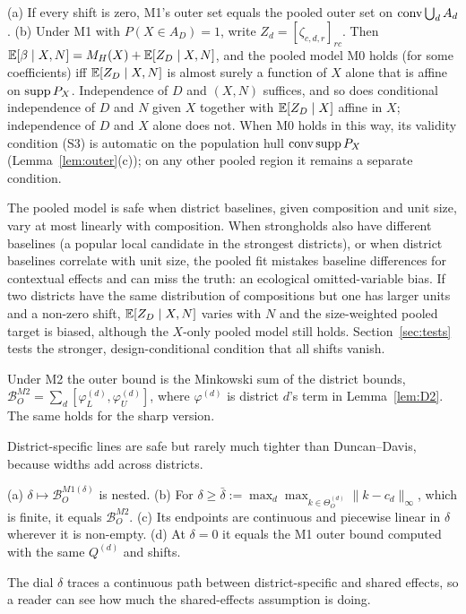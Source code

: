 \begin{proposition}\label{prop:D4}
(a) If every shift is zero, M1's outer set equals the pooled outer set on
$\operatorname{conv}\bigcup_dA_d$. (b) Under M1 with $P(X\in A_D)=1$, write $Z_d=[\zeta_{c,d,r}]_{rc}$.
Then $\mathbb E[\beta\mid X,N]=M_H(X)+\mathbb E[Z_D\mid X,N]$, and the pooled model M0 holds
(for some coefficients) iff $\mathbb E[Z_D\mid X,N]$ is almost surely a function of $X$
alone that is affine on $\operatorname{supp} P_X$. Independence of $D$ and $(X,N)$ suffices, and
so does conditional independence of $D$ and $N$ given $X$ together with
$\mathbb E[Z_D\mid X]$ affine in $X$; independence of $D$ and $X$ alone does not. When M0
holds in this way, its validity condition (S3) is automatic on the population hull
$\operatorname{conv}\operatorname{supp} P_X$ (Lemma~\ref{lem:outer}(c)); on any other pooled region it remains a
separate condition.
\end{proposition}
\begin{reading}
The pooled model is safe when district baselines, given composition and unit
size, vary at most linearly with composition. When strongholds also have
different baselines (a popular local candidate in the strongest districts), or
when district baselines correlate with unit size, the pooled fit mistakes
baseline differences for contextual effects and can miss the truth: an ecological
omitted-variable bias. If two districts have the same distribution of
compositions but one has larger units and a non-zero shift, $\mathbb E[Z_D\mid X,N]$
varies with $N$ and the size-weighted pooled target is biased, although the
$X$-only pooled model still holds. Section~\ref{sec:tests} tests the stronger,
design-conditional condition that all shifts vanish.
\end{reading}

\begin{proposition}\label{prop:D5}
Under M2 the outer bound is the Minkowski sum of the district bounds,
$\mathcal B^{M2}_O=\sum_d[\varphi^{(d)}_L,\varphi^{(d)}_U]$, where $\varphi^{(d)}$ is
district $d$'s term in Lemma~\ref{lem:D2}. The same holds for the sharp version.
\end{proposition}
\begin{reading}
District-specific lines are safe but rarely much tighter than Duncan--Davis,
because widths add across districts.
\end{reading}

\begin{proposition}\label{prop:D6}
(a) $\delta\mapsto\mathcal B^{M1(\delta)}_O$ is nested. (b) For
$\delta\ge\bar\delta:=\max_d\max_{k\in\Theta^{(d)}_O}\|k-c_d\|_\infty$, which is
finite, it equals $\mathcal B^{M2}_O$. (c) Its endpoints are continuous and
piecewise linear in $\delta$ wherever it is non-empty. (d) At $\delta=0$ it equals
the M1 outer bound computed with the same $Q^{(d)}$ and shifts.
\end{proposition}
\begin{reading}
The dial $\delta$ traces a continuous path between district-specific and shared
effects, so a reader can see how much the shared-effects assumption is doing.
\end{reading}


